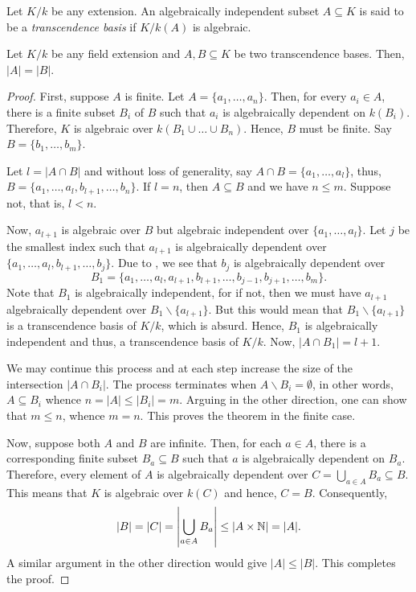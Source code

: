 \begin{definition}
    Let $K/k$ be any extension. An algebraically independent subset $A\subseteq K$ is said to be a \emph{transcendence basis} if $K/k(A)$ is algebraic.
\end{definition}

\begin{theorem}
    Let $K/k$ be any field extension and $A, B\subseteq K$ be two transcendence bases. Then, $|A| = |B|$.
\end{theorem}
\begin{proof}
    First, suppose $A$ is finite. Let $A = \{a_1,\dots,a_n\}$. Then, for every $a_i\in A$, there is a finite subset $B_i$ of $B$ such that $a_i$ is algebraically dependent on $k(B_i)$. Therefore, $K$ is algebraic over $k(B_1\cup\dots\cup B_n)$. Hence, $B$ must be finite. Say $B = \{b_1,\dots,b_m\}$. 

    Let $l = |A\cap B|$ and without loss of generality, say $A\cap B = \{a_1,\dots,a_l\}$, thus, $B = \{a_1,\dots,a_l,b_{l + 1},\dots,b_n\}$. If $l = n$, then $A\subseteq B$ and we have $n\le m$. Suppose not, that is, $l < n$. 

    Now, $a_{l + 1}$ is algebraic over $B$ but algebraic independent over $\{a_1,\dots,a_l\}$. Let $j$ be the smallest index such that $a_{l + 1}$ is algebraically dependent over $\{a_1,\dots,a_l,b_{l + 1},\dots,b_j\}$. Due to , we see that $b_j$ is algebraically dependent over 
    $$B_1 = \{a_1,\dots,a_l,a_{l + 1},b_{l + 1},\dots,b_{j - 1}, b_{j + 1},\dots,b_m\}.$$
    Note that $B_1$ is algebraically independent, for if not, then we must have $a_{l + 1}$ algebraically dependent over $B_1\backslash\{a_{l + 1}\}$. But this would mean that $B_1\backslash\{a_{l + 1}\}$ is a transcendence basis of $K/k$, which is absurd. Hence, $B_1$ is algebraically independent and thus, a transcendence basis of $K/k$. Now, $|A\cap B_1| = l + 1$.

    We may continue this process and at each step increase the size of the intersection $|A\cap B_i|$. The process terminates when $A\backslash B_i = \emptyset$, in other words, $A\subseteq B_i$ whence $n = |A|\le |B_i| = m$. Arguing in the other direction, one can show that $m\le n$, whence $m = n$. This proves the theorem in the finite case. 

    Now, suppose both $A$ and $B$ are infinite. Then, for each $a\in A$, there is a corresponding finite subset $B_a\subseteq B$ such that $a$ is algebraically dependent on $B_a$. Therefore, every element of $A$ is algebraically dependent over $C = \bigcup_{a\in A}B_a\subseteq B$. This means that $K$ is algebraic over $k(C)$ and hence, $C = B$. Consequently, 
    \begin{equation*}
        |B| = |C| = \left|\bigcup_{a\in A}B_a\right|\le\left|A\times\mathbb{N}\right| = |A|.
    \end{equation*}
    A similar argument in the other direction would give $|A|\le |B|$. This completes the proof.
\end{proof}


